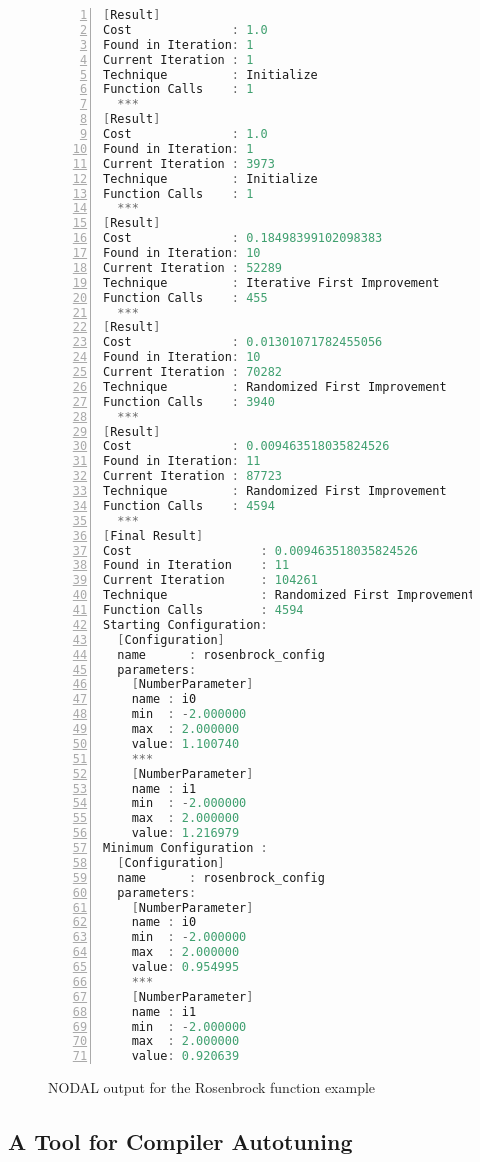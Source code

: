 \begin{figure}[htpb]
    \begin{minipage}{\linewidth}
    \begin{lstlisting}[language=C, basicstyle=\ttfamily\scriptsize,
        numbers=left,
        frame=no, showspaces=false, showstringspaces=false,
        numberstyle=\scriptsize,
        xleftmargin=1.5cm,
        keywords={%
            ResultChannel, AbstractChannel, return%
        },
        otherkeywords={::, \&, \*, +, -, /, [, ], >, <, put!, take!, neighbor!,
                       update!}
    ]
% julia rosenbrock.jl
[Result]
Cost              : 1.0
Found in Iteration: 1
Current Iteration : 1
Technique         : Initialize
Function Calls    : 1
  ***
[Result]
Cost              : 1.0
Found in Iteration: 1
Current Iteration : 3973
Technique         : Initialize
Function Calls    : 1
  ***
[Result]
Cost              : 0.18498399102098383
Found in Iteration: 10
Current Iteration : 52289
Technique         : Iterative First Improvement
Function Calls    : 455
  ***
[Result]
Cost              : 0.01301071782455056
Found in Iteration: 10
Current Iteration : 70282
Technique         : Randomized First Improvement
Function Calls    : 3940
  ***
[Result]
Cost              : 0.009463518035824526
Found in Iteration: 11
Current Iteration : 87723
Technique         : Randomized First Improvement
Function Calls    : 4594
  ***
[Final Result]
Cost                  : 0.009463518035824526
Found in Iteration    : 11
Current Iteration     : 104261
Technique             : Randomized First Improvement
Function Calls        : 4594
Starting Configuration:
  [Configuration]
  name      : rosenbrock_config
  parameters:
    [NumberParameter]
    name : i0
    min  : -2.000000
    max  : 2.000000
    value: 1.100740
    ***
    [NumberParameter]
    name : i1
    min  : -2.000000
    max  : 2.000000
    value: 1.216979
Minimum Configuration :
  [Configuration]
  name      : rosenbrock_config
  parameters:
    [NumberParameter]
    name : i0
    min  : -2.000000
    max  : 2.000000
    value: 0.954995
    ***
    [NumberParameter]
    name : i1
    min  : -2.000000
    max  : 2.000000
    value: 0.920639
    \end{lstlisting}
    \end{minipage}
    \caption{NODAL output for the Rosenbrock function example}
    \label{fig:nodal-output}
\end{figure}

\newpage

\subsection{A Tool for Compiler Autotuning}
\label{sec:nodal-gpu-tuner}

